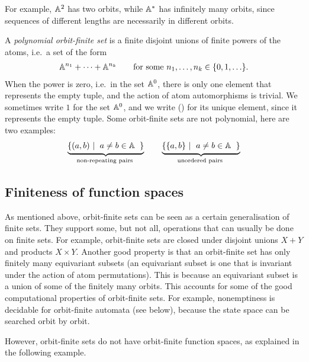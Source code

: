 For example,  $\mathbb A^2$ has two orbits, while   $\mathbb A^*$ has infinitely many orbits, since sequences of different lengths are necessarily in different orbits. 

\begin{example}\label{ex:polynomial-orbit-finite-sets} 
  A \emph{polynomial orbit-finite set} is a finite disjoint unions of finite powers of the atoms, i.e.~a set of the form 
    \begin{align*}
    \mathbb A^{n_1} + \cdots + \mathbb A^{n_k} \qquad \text{for some }n_1,\ldots,n_k \in \{0,1,\ldots\}.
    \end{align*}
    When the power is zero, i.e.~in the set $\mathbb A^0$, there is only one element  that represents the empty tuple, and the action of atom automorphisms is trivial. We sometimes write $1$ for the set $\mathbb A^0$, and we write () for its unique element, since it represents the empty tuple. Some orbit-finite sets are not polynomial, here are two examples:
    \begin{align*}
    \myunderbrace{
        \setbuild{(a,b)}{$a \neq b \in \atoms$}
    }{ non-repeating pairs}
    \qquad 
    \myunderbrace{
    \setbuild{\set{a,b}}{$a \neq b \in \atoms$}
    }{ unordered pairs} 
    \end{align*}  
        
\end{example}

\subsection{Finiteness of function spaces}
\label{sec:orbit-finite-function-spaces}
As mentioned above, orbit-finite sets can be seen as  a certain generalisation of finite sets. They support some, but not all, operations that can usually be done on finite sets. For example, orbit-finite sets are closed under disjoint unions $X + Y$ and products $X \times Y$.  Another good property is that an orbit-finite set has only finitely many equivariant subsets (an equivariant subset is one that is invariant under the action of atom permutations). This is because an equivariant subset is a union of some of the finitely many orbits. This accounts for some of the good computational properties of orbit-finite sets. For example, nonemptiness is decidable for orbit-finite automata (see below), because the state space can be searched orbit by orbit.

However, orbit-finite sets do not have orbit-finite function spaces, as explained in the following example. 

